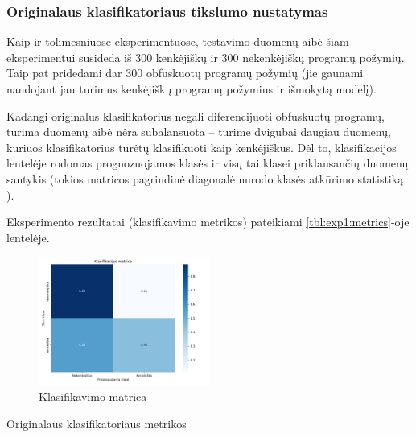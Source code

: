 \subsubsection{Originalaus klasifikatoriaus tikslumo nustatymas}%

Kaip ir tolimesniuose eksperimentuose, testavimo duomenų aibė šiam
eksperimentui susideda iš 300 kenkėjiškų ir 300 nekenkėjiškų programų požymių.
Taip pat pridedami dar 300 obfuskuotų programų požymių (jie gaunami naudojant
jau turimus kenkėjiškų programų požymius ir išmokytą \MALGAN modelį).

Kadangi originalus klasifikatorius negali diferencijuoti obfuskuotų programų,
turima duomenų aibė nėra subalansuota -- turime dvigubai daugiau duomenų,
kuriuos klasifikatorius turėtų klasifikuoti kaip kenkėjiškus. Dėl to,
klasifikacijos lentelėje  rodomas prognozuojamos klasės
ir visų tai klasei priklausančių duomenų santykis (tokios matricos pagrindinė
diagonalė nurodo klasės atkūrimo statistiką ).

Eksperimento rezultatai (klasifikavimo metrikos) pateikiami \ref{tbl:exp1:metrics}-oje lentelėje.
\begin{figure}[h]
    \centering
    \includegraphics[width=0.5\textwidth]{images/normal_2x2.png}
    \caption{Klasifikavimo matrica}
    \label{fig:exp1:confusion}
\end{figure}

\begin{table}[h]
    \caption{Originalaus klasifikatoriaus metrikos}
    \centering
    \label{tbl:exp1:metrics}
\end{table}